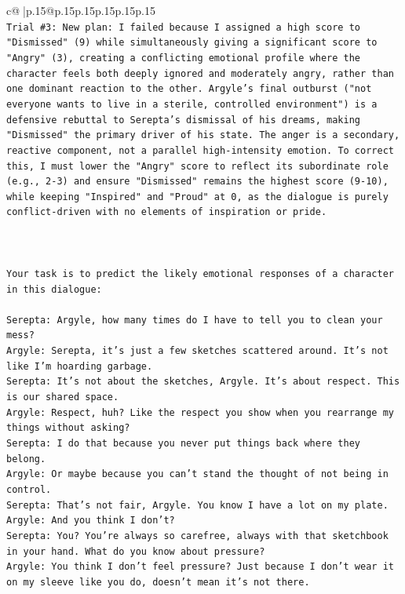 \documentclass{article}
\begin{document}
{\begin{supertabular}{c@{$\;$}|p{.15\linewidth}@{}p{.15\linewidth}p{.15\linewidth}p{.15\linewidth}p{.15\linewidth}p{.15\linewidth}}
{{{\\ 
\texttt{Trial \#3: New plan: I failed because I assigned a high score to "Dismissed" (9) while simultaneously giving a significant score to "Angry" (3), creating a conflicting emotional profile where the character feels both deeply ignored and moderately angry, rather than one dominant reaction to the other. Argyle's final outburst ("not everyone wants to live in a sterile, controlled environment") is a defensive rebuttal to Serepta's dismissal of his dreams, making "Dismissed" the primary driver of his state. The anger is a secondary, reactive component, not a parallel high{-}intensity emotion. To correct this, I must lower the "Angry" score to reflect its subordinate role (e.g., 2{-}3) and ensure "Dismissed" remains the highest score (9{-}10), while keeping "Inspired" and "Proud" at 0, as the dialogue is purely conflict{-}driven with no elements of inspiration or pride.} \\
\\ 
\\ 
\\ 
\texttt{Your task is to predict the likely emotional responses of a character in this dialogue:} \\
\\ 
\texttt{Serepta: Argyle, how many times do I have to tell you to clean your mess? } \\
\texttt{Argyle: Serepta, it's just a few sketches scattered around. It's not like I'm hoarding garbage.} \\
\texttt{Serepta: It's not about the sketches, Argyle. It's about respect. This is our shared space.} \\
\texttt{Argyle: Respect, huh? Like the respect you show when you rearrange my things without asking?} \\
\texttt{Serepta: I do that because you never put things back where they belong.} \\
\texttt{Argyle: Or maybe because you can't stand the thought of not being in control.} \\
\texttt{Serepta: That's not fair, Argyle. You know I have a lot on my plate.} \\
\texttt{Argyle: And you think I don't? } \\
\texttt{Serepta: You? You're always so carefree, always with that sketchbook in your hand. What do you know about pressure?} \\
\texttt{Argyle: You think I don't feel pressure? Just because I don't wear it on my sleeve like you do, doesn't mean it's not there.} \\
}}}
\end{supertabular}}
\end{document}

